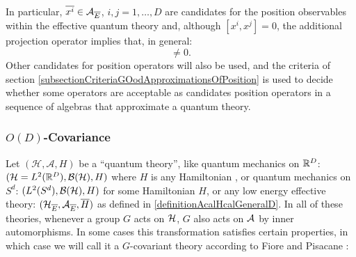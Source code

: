         

In particular, $\overline{x^i} \in \mathcal A_{\overline{E}}$, $i, j = 1, \dots, D$ are candidates for the position observables within the effective quantum theory and, although $[x^i, x^j] = 0$, the additional projection operator implies that, in general: 
\begin{equation}
    [\cut x^i, \cut x^j] \neq 0.
\end{equation}
Other candidates for position operators will also be used, and the criteria of section \ref{subsectionCriteriaGOodApproximationsOfPosition} is used to decide whether some operators are acceptable as candidates position operators in a sequence of algebras that approximate a quantum theory.

\subsubsection{$O(D)$-Covariance}

Let $(\mathcal H, \mathcal A, H)$ be a ``quantum theory'', like quantum mechanics on $\mathbb{R}^D$: $(\mathcal H = L^2(\mathbb{R}^D), \mathcal B(\mathcal H), H)$ where $H$ is any %
Hamiltonian%
, or quantum mechanics on $S^d$: $(L^2(S^d), \mathcal B(\mathcal H), H)$ for some Hamiltonian $H$, or any low energy effective theory: $(\mathcal H_{\overline{E}}, \mathcal A_{\overline{E}}, \overline{H})$ as defined in \ref{definitionAcalHcalGeneralD}. In all of these theories, whenever a group $G$ acts on $\mathcal H$, $G$ also acts on $\mathcal A$ by inner automorphisms. In some cases this transformation satisfies certain properties, in which case we will call it a $G$-covariant theory according to Fiore and Pisacane \cite{FioreTheCase2020}:

